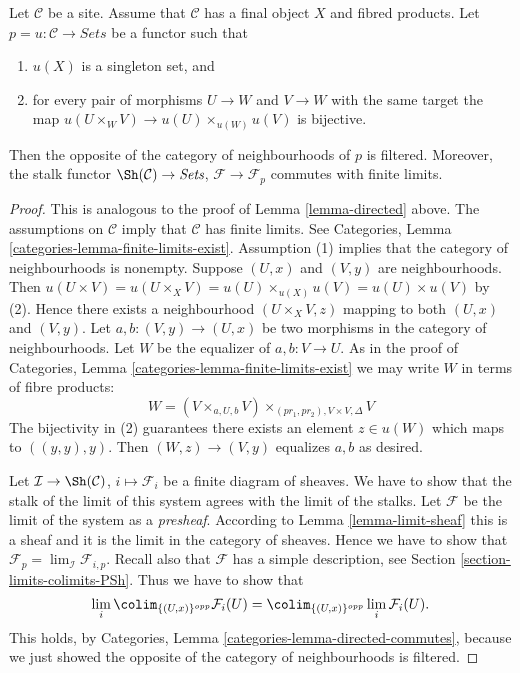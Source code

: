 \begin{lemma}
\label{lemma-neighbourhoods-directed}
Let $\mathcal{C}$ be a site. Assume that $\mathcal{C}$ has
a final object $X$ and fibred products.
Let $p = u : \mathcal{C} \to \textit{Sets}$ be a functor such that
\begin{enumerate}
\item $u(X)$ is a singleton set, and
\item for every pair of morphisms $U \to W$ and $V \to W$ with
the same target the map
$u(U \times_W V) \to u(U) \times_{u(W)} u(V)$ is bijective.
\end{enumerate}
Then the opposite of the category of neighbourhoods of $p$ is filtered.
Moreover, the stalk functor $\Sh(\mathcal{C}) \to \textit{Sets}$,
$\mathcal{F} \to \mathcal{F}_p$ commutes with finite limits.
\end{lemma}

\begin{proof}
This is analogous to the proof of Lemma \ref{lemma-directed} above.
The assumptions on $\mathcal{C}$ imply that $\mathcal{C}$ has finite limits.
See Categories, Lemma \ref{categories-lemma-finite-limits-exist}.
Assumption (1) implies that the category of neighbourhoods
is nonempty. Suppose $(U, x)$ and $(V, y)$ are neighbourhoods.
Then
$u(U \times V) = u(U \times_X V) =
u(U) \times_{u(X)} u(V) = u(U) \times u(V)$ by (2).
Hence there exists a neighbourhood $(U \times_X V, z)$ mapping
to both $(U, x)$ and $(V, y)$.
Let $a, b : (V, y) \to (U, x)$ be two morphisms
in the category of neighbourhoods. Let $W$ be the equalizer of
$a, b : V \to U$. As in the proof of
Categories, Lemma \ref{categories-lemma-finite-limits-exist}
we may write $W$ in terms of fibre products:
$$
W = (V \times_{a, U, b} V) \times_{(pr_1, pr_2), V \times V, \Delta} V
$$
The bijectivity in (2) guarantees there exists an element $z \in u(W)$
which maps to $((y, y), y)$.
Then $(W, z) \to (V, y)$ equalizes $a, b$ as desired.

\medskip\noindent
Let $\mathcal{I} \to \Sh(\mathcal{C})$,
$i \mapsto \mathcal{F}_i$ be a finite diagram of sheaves.
We have to show that the stalk of the limit of this
system agrees with the limit of the stalks.
Let $\mathcal{F}$ be the limit of the system as a {\it presheaf}.
According to Lemma \ref{lemma-limit-sheaf} this is a sheaf and
it is the limit in the category of sheaves.
Hence we have to show that
$\mathcal{F}_p = \lim_\mathcal{I} \mathcal{F}_{i, p}$.
Recall also that $\mathcal{F}$ has a simple description, see
Section \ref{section-limits-colimits-PSh}. Thus we have to show that
$$
\lim_i \colim_{\{(U, x)\}^{opp}} \mathcal{F}_i(U)
=
\colim_{\{(U, x)\}^{opp}} \lim_i \mathcal{F}_i(U).
$$
This holds, by Categories, Lemma \ref{categories-lemma-directed-commutes},
because we just showed the opposite of the category of neighbourhoods
is filtered.
\end{proof}


